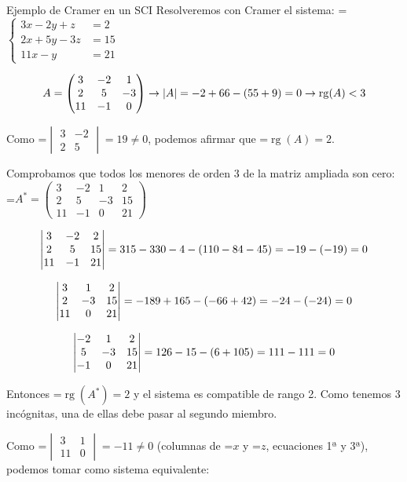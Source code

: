 \documentclass[11pt,a4paper]{article}
\newcommand{\fmm}[1]{\setbox0=\hbox{$#1$}\ifdim\wd0>\linewidth\fmdisp{#1}\else\mbox{\box0}\fi}
\newcommand{\fmdisp}[1]{\[\setbox2=\hbox{$\displaystyle #1$}\ifdim\wd2>\linewidth\resizebox{\linewidth}{!}{\box2}\else\box2\fi\]}
\begin{document}
\begin{fmex}{Ejemplo de Cramer en un SCI}
Resolveremos con Cramer el sistema: \fmm{\left\{\begin{aligned}3x-2y+z&=2\\ 2x+5y-3z&=15\\ 11x-y&=21\end{aligned}\right.}

\fmdisp{A=\begin{pmatrix}3 & -2 & 1\\ 2 & 5 & -3\\ 11 & -1 & 0\end{pmatrix}\rightarrow|A|=-2+66-(55+9)=0\rightarrow\operatorname{rg}(A)<3}

Como \fmm{\begin{vmatrix}3 & -2\\ 2 & 5\end{vmatrix}=19\neq0}, podemos afirmar que \fmm{\operatorname{rg}(A)=2}.

Comprobamos que todos los menores de orden 3 de la matriz ampliada son cero: \fmm{A^*=\left(\begin{array}{rrr|r}3 & -2 & 1 & 2\\ 2 & 5 & -3 & 15\\ 11 & -1 & 0 & 21\end{array}\right)}

\fmdisp{\begin{vmatrix}3 & -2 & 2\\ 2 & 5 & 15\\ 11 & -1 & 21\end{vmatrix}=315-330-4-(110-84-45)=-19-(-19)=0}

\fmdisp{\begin{vmatrix}3 & 1 & 2\\ 2 & -3 & 15\\ 11 & 0 & 21\end{vmatrix}=-189+165-(-66+42)=-24-(-24)=0}

\fmdisp{\begin{vmatrix}-2 & 1 & 2\\ 5 & -3 & 15\\ -1 & 0 & 21\end{vmatrix}=126-15-(6+105)=111-111=0}

Entonces \fmm{\operatorname{rg}(A^*)=2} y el sistema es compatible de rango 2. Como tenemos 3 incógnitas, una de ellas debe pasar al segundo miembro.

Como \fmm{\begin{vmatrix}3 & 1\\ 11 & 0\end{vmatrix}=-11\neq0} (columnas de \fmm{x} y \fmm{z}, ecuaciones 1ª y 3ª), podemos tomar como sistema equivalente:


\end{fmex}
\end{document}
